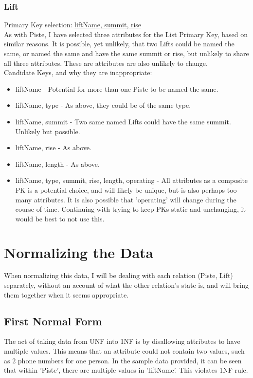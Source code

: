 \documentclass[11pt]{scrartcl} %
\begin{document}
\subsubsection{Lift}
Primary Key selection: \underline{liftName, summit, rise}\\
As with Piste, I have selected three attributes for the List Primary Key, based on similar reasons. It is possible, yet unlikely, that two Lifts could be named the same, or named the same and have the same summit or rise, but unlikely to share all three attributes. These are attributes are also unlikely to change.\\[0.2cm]
Candidate Keys, and why they are inappropriate:
\begin{itemize}[]
\item liftName - Potential for more than one Piste to be named the same.
\item liftName, type - As above, they could be of the same type.
\item liftName, summit - Two same named Lifts could have the same summit. Unlikely but possible.
\item liftName, rise - As above.
\item liftName, length - As above.
\item liftName, type, summit, rise, length, operating - All attributes as a composite PK is a potential choice, and will likely be unique, but is also perhaps too many attributes. It is also possible that 'operating' will change during the course of time. Continuing with trying to keep PKs static and unchanging, it would be best to not use this.
\end{itemize}

\newpage

\section{Normalizing the Data}
When normalizing this data, I will be dealing with each relation (Piste, Lift) separately, without an account of what the other relation's state is, and will bring them together when it seems appropriate.
\subsection{First Normal Form}
The act of taking data from UNF into 1NF is by disallowing attributes to have multiple values. This means that an attribute could not contain two values, such as 2 phone numbers for one person. In the sample data provided, it can be seen that within 'Piste', there are multiple values in 'liftName'. This violates 1NF rule.
\end{document}
